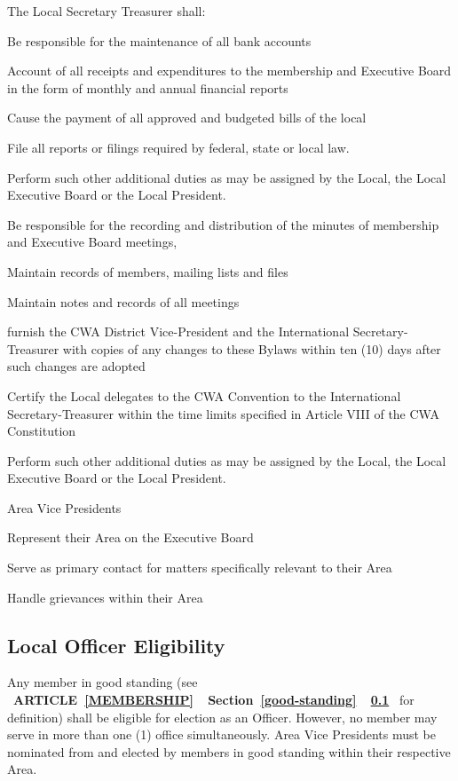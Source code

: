 \documentclass[12pt]{article}
\newcommand{\fullref}[3]{%
  \mbox{\textbf{%
    \ifthenelse{\isempty{#1}}%
    {}%
    {\MakeUppercase{Article \ref{#1}}}%
    \ifthenelse{\isempty{#2}}%
    {}%
    {%
      \ifthenelse{\isempty{#1}}{}{, }%
      Section \ref{#2}%
    }%
    \ifthenelse{\isempty{#3}}%
    {}%
    {\ref{#3}}%
  }}%
}
\begin{document}
\begin{letterlist}
\item The Local Secretary Treasurer shall:
  \begin{numberlist}
    \item Be responsible for the maintenance of all bank accounts
    \item Account of all receipts and expenditures to the membership and Executive Board in the form of monthly and annual financial reports
    \item Cause the payment of all approved and budgeted bills of the local
    \item File all reports or filings required by federal, state or local law.
    \item Perform such other additional duties as may be assigned by the Local, the Local Executive Board or the Local President.
    \item Be responsible for the recording and distribution of the minutes of membership and Executive Board meetings,
    \item Maintain records of members, mailing lists and files
    \item Maintain notes and records of all meetings
    \item  furnish the CWA District Vice-President and the International Secretary-Treasurer with copies of any changes to these Bylaws within ten (10) days after such changes are adopted
    \item Certify the Local delegates to the CWA Convention to the International Secretary-Treasurer within the time limits specified in Article VIII of the CWA Constitution
    \item Perform such other additional duties as may be assigned by the Local, the Local Executive Board or the Local President.
    \end{numberlist}

\item Area Vice Presidents
  \begin{numberlist}
    \item Represent their Area on the Executive Board
    \item Serve as primary contact for matters specifically relevant to their Area
    \item Handle grievances within their Area
  \end{numberlist}
\end{letterlist}

\subsection{Local Officer Eligibility}
Any member in good standing (see \fullref{membership}{good-standing}{} for definition) shall be eligible for election as an Officer. However, no member may serve in more than one (1) office simultaneously. Area Vice Presidents must be nominated from and elected by members in good standing within their respective Area.
\end{document}

